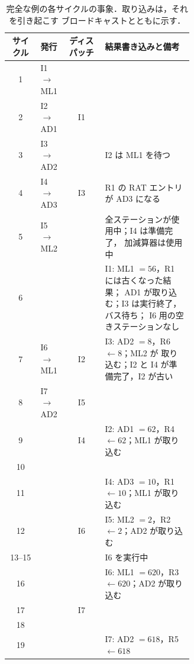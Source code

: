 \documentclass[../main.tex]{subfiles}
\begin{document}
\begin{table}[htbp]
  \centering\small
  \caption{完全な例の各サイクルの事象．取り込みは，それを引き起こす
    ブロードキャストとともに示す．}
  \label{tab:l07-trace}
  \begin{tabular}{@{}c>{\raggedright\arraybackslash}p{0.14\linewidth}c>{\raggedright\arraybackslash}p{0.48\linewidth}@{}}
    \toprule
    サイクル & 発行 & ディスパッチ & 結果書き込みと備考 \\
    \midrule
    1     & I1 $\to$ ML1 &    & \\
    2     & I2 $\to$ AD1 & I1 & \\
    3     & I3 $\to$ AD2 &    & I2 は ML1 を待つ \\
    4     & I4 $\to$ AD3 & I3 & R1 の RAT エントリが AD3 になる \\
    5     & I5 $\to$ ML2 &    & 全ステーションが使用中；I4 は準備完了，
                                加減算器は使用中 \\
    6     &              &    & I1: ML1 $=56$，R1 には古くなった結果；
                                AD1 が取り込む；I3 は実行終了，バス待ち；
                                I6 用の空きステーションなし \\
    7     & I6 $\to$ ML1 & I2 & I3: AD2 $=8$，R6 $\leftarrow 8$；ML2 が
                                取り込む；I2 と I4 が準備完了，I2 が古い \\
    8     & I7 $\to$ AD2 & I5 & \\
    9     &              & I4 & I2: AD1 $=62$，R4 $\leftarrow 62$；ML1 が取り込む \\
    10    &              &    & \\
    11    &              &    & I4: AD3 $=10$，R1 $\leftarrow 10$；ML1 が取り込む \\
    12    &              & I6 & I5: ML2 $=2$，R2 $\leftarrow 2$；AD2 が取り込む \\
    13--15 &             &    & I6 を実行中 \\
    16    &              &    & I6: ML1 $=620$，R3 $\leftarrow 620$；AD2 が取り込む \\
    17    &              & I7 & \\
    18    &              &    & \\
    19    &              &    & I7: AD2 $=618$，R5 $\leftarrow 618$ \\
    \bottomrule
  \end{tabular}
\end{table}
\end{document}
